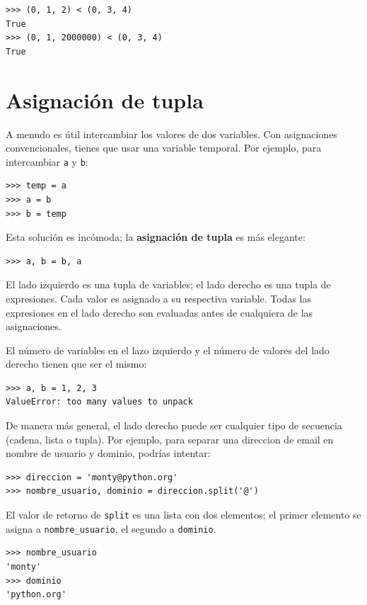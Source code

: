 \documentclass[10pt]{book}
\begin{document}
\begin{verbatim}
>>> (0, 1, 2) < (0, 3, 4)
True
>>> (0, 1, 2000000) < (0, 3, 4)
True
\end{verbatim}



\section{Asignación de tupla}
\label{tuple.assignment}

A menudo es útil intercambiar los valores de dos variables.
Con asignaciones convencionales, tienes que usar una variable
temporal.  Por ejemplo, para intercambiar {\tt a} y {\tt b}:

\begin{verbatim}
>>> temp = a
>>> a = b
>>> b = temp
\end{verbatim}
%
Esta solución es incómoda; la {\bf asignación de tupla} es más elegante:

\begin{verbatim}
>>> a, b = b, a
\end{verbatim}
%
El lado izquierdo es una tupla de variables; el lado derecho es una tupla de
expresiones.  Cada valor es asignado a su respectiva variable.
Todas las expresiones en el lado derecho son evaluadas antes de cualquiera
de las asignaciones.

El número de variables en el lazo izquierdo y el número de valores del
lado derecho tienen que ser el mismo:

\begin{verbatim}
>>> a, b = 1, 2, 3
ValueError: too many values to unpack
\end{verbatim}
%
De manera más general, el lado derecho puede ser cualquier tipo de secuencia
(cadena, lista o tupla).  Por ejemplo, para separar una direccion de email
en nombre de usuario y dominio, podrías intentar:

\begin{verbatim}
>>> direccion = 'monty@python.org'
>>> nombre_usuario, dominio = direccion.split('@')
\end{verbatim}
%
El valor de retorno de {\tt split} es una lista con dos elementos;
el primer elemento se asigna a {\tt nombre\_usuario}, el segundo a
{\tt dominio}.

\begin{verbatim}
>>> nombre_usuario
'monty'
>>> dominio
'python.org'
\end{verbatim}
%
\end{document}
